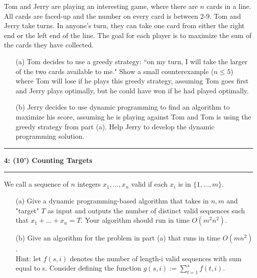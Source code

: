 \documentclass[10.5pt]{article}
\newcommand\question[2]{\vspace{.25in}\hrule\textbf{#1: #2}\vspace{.5em}\hrule\vspace{.10in}}
\begin{document}
Tom and Jerry are playing an interesting game, where there are $n$ cards in a line. All cards are faced-up and the number on every card is between 2-9. Tom and Jerry take turns. In anyone's turn, they can take one card from either the right end or the left end of the line. The goal for each player is to maximize the sum of the cards they have collected.

\begin{enumerate}
\item[(a)] Tom decides to use a greedy strategy: ``on my turn, I will take the larger of the two cards available to me." Show a small counterexample ($n\leq 5$) where Tom will lose if he plays this greedy strategy, assuming Tom goes first and Jerry plays optimally, but he could have won if he had played optimally.
\item[(b)] Jerry decides to use dynamic programming to find an algorithm to maximize his score, assuming he is playing against Tom and Tom is using the greedy strategy from part (a). Help Jerry to develop the dynamic programming solution.
\end{enumerate}
\pagebreak

\question{4}{(10') Counting Targets}
We call a sequence of $n$ integers $x_1, ... ,x_n$ valid if each $x_i$ is in $\{1, ..., m\}$.
\begin{enumerate}
\item[(a)] Give a dynamic programming-based algorithm that takes in $n, m$ and "target" $T$ as input
and outputs the number of distinct valid sequences such that $x_1 + ... + x_n = T$. Your
algorithm should run in time $O(m^2n^2)$.
\item[(b)] Give an algorithm for the problem in part (a) that runs in time $O(mn^2)$.
\\
Hint: let $f(s, i)$ denotes the number of length-i valid sequences with sum equal to s.
Consider defining the function $g(s, i) :=\sum^s_{t=1} f(t, i).$
\end{enumerate}
\end{document}
